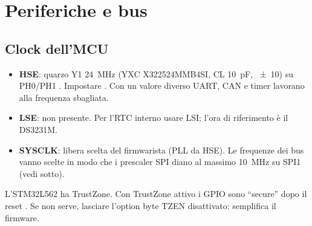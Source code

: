 \chapter{Periferiche e bus}
\label{ch:periferiche}

\section{Clock dell'MCU}
\begin{itemize}
\item \textbf{HSE}: quarzo Y1 \SI{24}{\mega\hertz} (YXC X322524MMB4SI, CL \SI{10}{\pico\farad}, \SI{\pm10}{\ppm}) su PH0/PH1 . Impostare  . Con un valore diverso UART, CAN e timer lavorano alla frequenza sbagliata.
\item \textbf{LSE}: non presente. Per l'RTC interno usare LSI; l'ora di riferimento è il DS3231M.
\item \textbf{SYSCLK}: libera scelta del firmwarista (PLL da HSE). Le frequenze dei bus vanno scelte in modo che i prescaler SPI diano al massimo \SI{10}{\mega\hertz} su SPI1 (vedi sotto).
\end{itemize}

\begin{nota}[TrustZone]
L'STM32L562 ha TrustZone. Con TrustZone attivo i GPIO sono \enquote{secure} dopo il reset . Se non serve, lasciare l'option byte TZEN disattivato: semplifica il firmware.
\end{nota}

